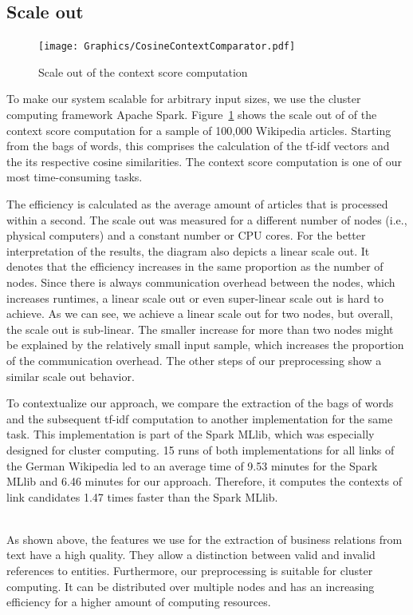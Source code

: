 \subsection{Scale out}
\begin{figure}[ht]
	\centering
  \texttt{[image: Graphics/CosineContextComparator.pdf]}
	\caption{Scale out of the context score computation}
	\label{fig:scale_out}
\end{figure}

To make our system scalable for arbitrary input sizes, we use the cluster computing framework Apache Spark\footnotemark{}. Figure~\ref{fig:scale_out} shows the scale out of of the context score computation for a sample of 100,000 Wikipedia articles. Starting from the bags of words, this comprises the calculation of the tf-idf vectors and the its respective cosine similarities. The context score computation is one of our most time-consuming tasks.

The efficiency is calculated as the average amount of articles that is processed within a second. The scale out was measured for a different number of nodes (i.e., physical computers) and a constant number or CPU cores. For the better interpretation of the results, the diagram also depicts a linear scale out. It denotes that the efficiency increases in the same proportion as the number of nodes. Since there is always communication overhead between the nodes, which increases runtimes, a linear scale out or even super-linear scale out is hard to achieve. As we can see, we achieve a linear scale out for two nodes, but overall, the scale out is sub-linear. The smaller increase for more than two nodes might be explained by the relatively small input sample, which increases the proportion of the communication overhead. The other steps of our preprocessing show a similar scale out behavior.

To contextualize our approach, we compare the extraction of the bags of words and the subsequent tf-idf computation to another implementation for the same task. This implementation is part of the Spark MLlib\footnotemark{}, which was especially designed for cluster computing. 15 runs of both implementations for all links of the German Wikipedia led to an average time of 9.53 minutes for the Spark MLlib and 6.46 minutes for our approach. Therefore, it computes the contexts of link candidates 1.47 times faster than the Spark MLlib.

~\\

As shown above, the features we use for the extraction of business relations from text have a high quality. They allow a distinction between valid and invalid references to entities. Furthermore, our preprocessing is suitable for cluster computing. It can be distributed over multiple nodes and has an increasing efficiency for a higher amount of computing resources.